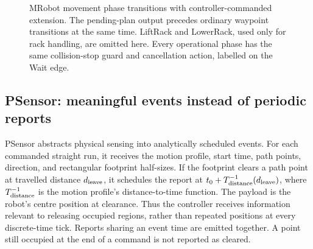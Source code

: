 \documentclass[11pt,a4paper]{article}
\theoremstyle{remark}
\begin{document}
\begin{figure}[htbp]
{}
\caption{MRobot movement phase transitions with controller-commanded extension.
The pending-plan output precedes ordinary waypoint transitions at the same time.
LiftRack and LowerRack, used only for rack handling, are omitted here.
Every operational phase has the same
collision-stop guard and cancellation action, labelled on the Wait edge.}
\label{fig:mrobot-phases}
\end{figure}

\clearpage
\subsection{PSensor: meaningful events instead of periodic reports}
PSensor abstracts physical sensing into analytically scheduled events.
For each commanded straight run, it receives the motion profile, start
time, path points, direction, and rectangular footprint half-sizes.
If the footprint clears a path point at travelled distance $d_{\rm leave}$,
it schedules the report at $t_0+T^{-1}_{\rm distance}(d_{\rm leave})$,
where $T^{-1}_{\rm distance}$ is the motion profile's distance-to-time
function. The payload is the robot's centre position at clearance.
Thus the controller receives information relevant to releasing occupied
regions, rather than repeated positions at every discrete-time tick.
Reports sharing an event time are emitted together. A point still occupied
at the end of a command is not reported as cleared.
\end{document}
